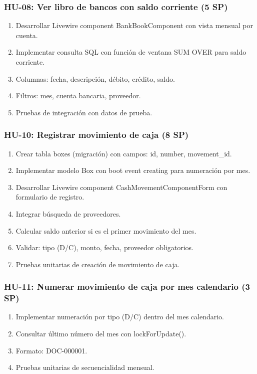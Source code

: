 \documentclass[stu]{apa7}
\begin{document}
\subsubsection{HU-08: Ver libro de bancos con saldo corriente (5 SP)}

\begin{enumerate}
    \item Desarrollar Livewire component BankBookComponent con vista mensual por cuenta.
    \item Implementar consulta SQL con función de ventana SUM OVER para saldo corriente.
    \item Columnas: fecha, descripción, débito, crédito, saldo.
    \item Filtros: mes, cuenta bancaria, proveedor.
    \item Pruebas de integración con datos de prueba.
\end{enumerate}

\subsubsection{HU-10: Registrar movimiento de caja (8 SP)}

\begin{enumerate}
    \item Crear tabla boxes (migración) con campos: id, number, movement\_id.
    \item Implementar modelo Box con boot event creating para numeración por mes.
    \item Desarrollar Livewire component CashMovementComponentForm con formulario de registro.
    \item Integrar búsqueda de proveedores.
    \item Calcular saldo anterior si es el primer movimiento del mes.
    \item Validar: tipo (D/C), monto, fecha, proveedor obligatorios.
    \item Pruebas unitarias de creación de movimiento de caja.
\end{enumerate}

\subsubsection{HU-11: Numerar movimiento de caja por mes calendario (3 SP)}

\begin{enumerate}
    \item Implementar numeración por tipo (D/C) dentro del mes calendario.
    \item Consultar último número del mes con lockForUpdate().
    \item Formato: DOC-000001.
    \item Pruebas unitarias de secuencialidad mensual.
\end{enumerate}
\end{document}
